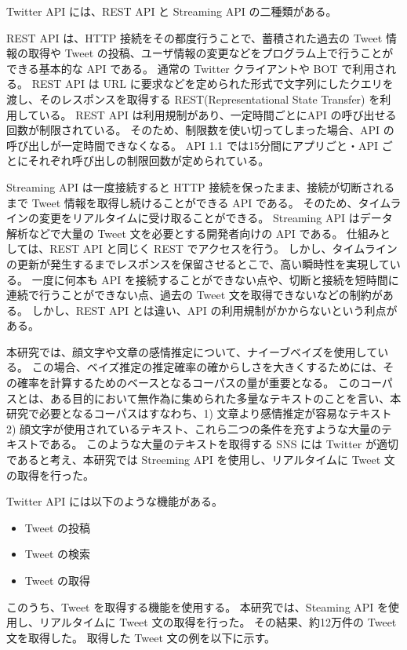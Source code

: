 \documentclass[11pt,a4j]{jsarticle}
\begin{document}
Twitter API には、REST API と Streaming API の二種類がある。

REST API は、HTTP 接続をその都度行うことで、蓄積された過去の Tweet 情報の取得や Tweet の投稿、ユーザ情報の変更などをプログラム上で行うことができる基本的な API である。
通常の Twitter クライアントや BOT で利用される。
REST API は URL に要求などを定められた形式で文字列にしたクエリを渡し、そのレスポンスを取得する REST(Representational State Transfer) を利用している。
REST API は利用規制があり、一定時間ごとにAPI の呼び出せる回数が制限されている。
そのため、制限数を使い切ってしまった場合、API の呼び出しが一定時間できなくなる。
API 1.1 では15分間にアプリごと・API ごとにそれぞれ呼び出しの制限回数が定められている。

Streaming API は一度接続すると HTTP 接続を保ったまま、接続が切断されるまで Tweet 情報を取得し続けることができる API である。
そのため、タイムラインの変更をリアルタイムに受け取ることができる。
Streaming API はデータ解析などで大量の Tweet 文を必要とする開発者向けの API である。
仕組みとしては、REST API と同じく REST でアクセスを行う。
しかし、タイムラインの更新が発生するまでレスポンスを保留させるとこで、高い瞬時性を実現している。
一度に何本も API を接続することができない点や、切断と接続を短時間に連続で行うことができない点、過去の Tweet 文を取得できないなどの制約がある。
しかし、REST API とは違い、API の利用規制がかからないという利点がある。

本研究では、顔文字や文章の感情推定について、ナイーブベイズを使用している。
この場合、ベイズ推定の推定確率の確からしさを大きくするためには、その確率を計算するためのベースとなるコーパスの量が重要となる。
このコーパスとは、ある目的において無作為に集められた多量なテキストのことを言い、本研究で必要となるコーパスはすなわち、1) 文章より感情推定が容易なテキスト 2) 顔文字が使用されているテキスト、これら二つの条件を充すような大量のテキストである。
このような大量のテキストを取得する SNS には Twitter が適切であると考え、本研究では Streeming API を使用し、リアルタイムに Tweet 文の取得を行った。

Twitter API には以下のような機能がある。

\begin{itemize}
  \item Tweet の投稿
  \item Tweet の検索
  \item Tweet の取得
\end{itemize}

このうち、Tweet を取得する機能を使用する。
本研究では、Steaming API を使用し、リアルタイムに Tweet 文の取得を行った。
その結果、約12万件の Tweet 文を取得した。
取得した Tweet 文の例を以下に示す。
\end{document}
